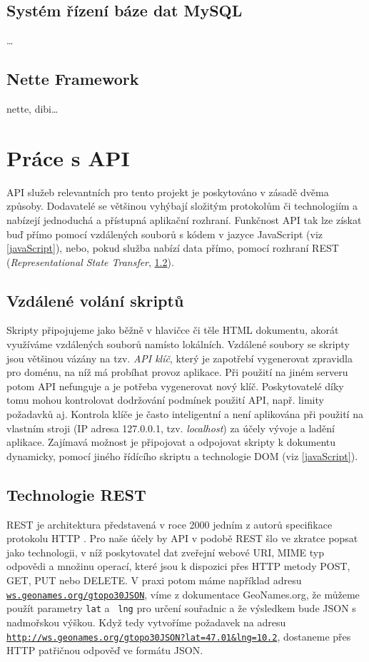 \subsection{Systém řízení báze dat MySQL}
\ldots
\subsection{Nette Framework}
nette, dibi\ldots

\section{Práce s API}\label{api}
API služeb relevantních pro tento projekt je poskytováno v zásadě
dvěma způsoby. Dodavatelé se většinou vyhýbají složitým protokolům či
technologiím a nabízejí jednoduchá a přístupná aplikační rozhraní.
Funkčnost API tak lze získat buď přímo pomocí vzdálených souborů s
kódem v jazyce JavaScript (viz \ref{javaScript}), nebo, pokud služba
nabízí data přímo, pomocí rozhraní REST ({\it Representational State
Transfer}, \ref{rest}).

\subsection{Vzdálené volání skriptů}
Skripty připojujeme jako běžně v hlavičce či těle HTML
dokumentu, akorát využíváme vzdálených souborů namísto lokálních.
Vzdálené soubory se skripty jsou většinou vázány na tzv. {\it API
klíč}, který je zapotřebí vygenerovat zpravidla pro doménu, na níž má
probíhat provoz aplikace. Při použití na jiném serveru potom API
nefunguje a je potřeba vygenerovat nový klíč. Poskytovatelé díky tomu
mohou kontrolovat dodržování podmínek použití API, např. limity
požadavků aj. Kontrola klíče je často inteligentní a není aplikována
při použití na vlastním stroji (IP adresa 127.0.0.1, tzv. {\it
localhost}) za účely vývoje a ladění aplikace. Zajímavá možnost je
připojovat a odpojovat skripty k dokumentu dynamicky, pomocí jiného
řídícího skriptu a technologie DOM (viz \ref{javaScript}).

\subsection{Technologie REST}\label{rest}
REST je architektura představená v roce 2000 jedním z autorů
specifikace protokolu HTTP \cite{rest}. Pro naše účely by API v
podobě REST šlo ve zkratce popsat jako technologii, v níž poskytovatel dat zveřejní webové URI, MIME typ odpovědi a množinu operací, které jsou k dispozici přes HTTP metody POST, GET, PUT nebo DELETE. V praxi
potom máme například adresu {\tt \url{ws.geonames.org/gtopo30JSON}},
víme z dokumentace GeoNames.org, že můžeme použít parametry {\tt lat} a {\tt
lng} pro určení souřadnic a že výsledkem bude JSON s nadmořskou
výškou. Když tedy vytvoříme požadavek na adresu
{\tt \url{http://ws.geonames.org/gtopo30JSON?lat=47.01&lng=10.2}},
dostaneme přes HTTP patřičnou odpověď ve formátu JSON.

